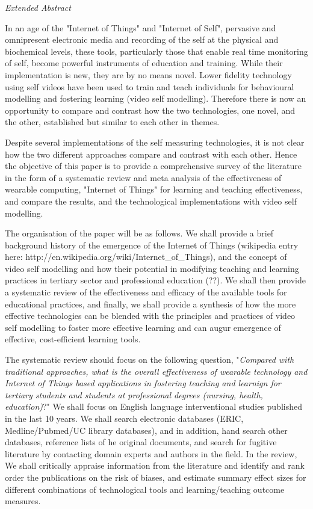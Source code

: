 \textit{Extended Abstract} 

In an age of the "Internet of Things" and "Internet of Self", pervasive and omnipresent electronic media and recording of the self at the physical and biochemical levels, these tools, particularly those that enable real time monitoring of self, become powerful instruments of education and training. While their implementation is new, they are by no means novel. Lower fidelity technology using self videos have been used to train and teach individuals for behavioural modelling and fostering learning (video self modelling). Therefore there is now an opportunity to compare and contrast how the two technologies, one novel, and the other, established but similar to each other in themes. 

Despite several implementations of the self measuring technologies, it is not clear how the two different approaches compare and contrast with each other. Hence the objective of this paper is to provide a comprehensive survey of the literature in the form of a systematic review and meta analysis of the effectiveness of wearable computing, "Internet of Things" for learning and teaching effectiveness, and compare the results, and the technological implementations with video self modelling. 

The organisation of the paper will be as follows. We shall provide a brief background history of the emergence of the Internet of Things (wikipedia entry here: http://en.wikipedia.org/wiki/Internet_of_Things), and the concept of video self modelling and how their potential in modifying teaching and learning practices in tertiary sector and professional education (??). We shall then provide a systematic review of the effectiveness and efficacy of the available tools for educational practices, and finally, we shall provide a synthesis of how the more effective technologies can be blended with the principles and practices of video self modelling to foster more effective learning and can augur emergence of effective, cost-efficient learning tools.

The systematic review should focus on the following question, "\textit{Compared with traditional approaches, what is the overall effectiveness of wearable technology and Internet of Things based applications in fostering teaching and learnign for tertiary students and students at professional degrees (nursing, health, education)}?" We shall focus on English language interventional studies published in the last 10 years. We shall search electronic databases (ERIC, Medline/Pubmed/UC library databases), and in addition,  hand search other databases, reference lists of he original documents, and search for fugitive literature by contacting domain experts and authors in the field. In the review, We shall critically appraise information from the literature and identify and rank order the publications on the risk of biases, and estimate summary effect sizes for different combinations of technological tools and learning/teaching outcome measures. 

